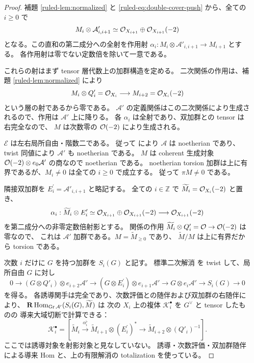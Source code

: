 \begin{proof}
補題 \ref{ruled-lem:normalized} と \eqref{ruled-eq:double-cover-push} から、全ての $i\ge0$ で
\[
 M_i\otimes\mathcal A'_{i,i+1}
 \simeq\mathcal O_{X_{i+1}}\oplus\mathcal O_{X_{i+1}}(-2)
\]
となる。この直和の第二成分への全射を作用射
$\alpha_i:M_i\otimes\mathcal A'_{i,i+1}\to M_{i+1}$ とする。
各作用射は零でない定数倍を除いて一意である。

これらの射はまず tensor 層代数上の加群構造を定める。
二次関係の作用は、補題 \ref{ruled-lem:normalized} により
\[
 M_i\otimes Q'_i=\mathcal O_{X_i}
 \longrightarrow M_{i+2}=\mathcal O_{X_i}(-2)
\]
という層の射であるから零である。
$\mathcal A'$ の定義関係はこの二次関係により生成されるので、作用は
$\mathcal A'$ 上に降りる。
各 $\alpha_i$ は全射であり、双加群との tensor は右完全なので、
$M$ は次数零の $\mathcal O(-2)$ により生成される。

$\mathcal E$ は左右局所自由・階数二である。
従って \cite[Theorem 1.2]{VanDenBergh2012P1} により $\mathcal A$ は noetherian であり、
twist 同値により $\mathcal A'$ も noetherian である。
$M$ は coherent 生成対象 $\mathcal O(-2)\otimes e_0\mathcal A'$ の商なので noetherian である。
noetherian torsion 加群は上に有界であるが、$M_i\ne0$ は全ての $i\ge0$ で成立する。
従って $\pi M\ne0$ である。

隣接双加群を $E_i^\prime=\mathcal A'_{i,i+1}$ と略記する。
全ての $i\in\mathbb Z$ で $\widetilde M_i=\mathcal O_{X_i}(-2)$ と置き、
\[
 \alpha_i:\widetilde M_i\otimes E_i^\prime
 \simeq\mathcal O_{X_{i+1}}\oplus\mathcal O_{X_{i+1}}(-2)
 \longrightarrow\mathcal O_{X_{i+1}}(-2)
\]
を第二成分への非零定数倍射影とする。
関係の作用 $\widetilde M_i\otimes Q'_i=\mathcal O\to\mathcal O(-2)$ は零なので、
これは $\mathcal A'$ 加群である。$M=\widetilde M_{\ge0}$ であり、
$\widetilde M/M$ は上に有界だから torsion である。

次数 $i$ だけに $G$ を持つ加群を $S_i(G)$ と記す。
標準二次解消 \cite[Theorem 7.1.2]{VanDenBergh2012P1} を twist して、局所自由 $G$ に対し
\[
 0\to(G\otimes Q'_i)\otimes e_{i+2}\mathcal A'
 \to(G\otimes E_i^\prime)\otimes e_{i+1}\mathcal A'
 \to G\otimes e_i\mathcal A'\to S_i(G)\to0
\]
を得る。
各誘導関手は完全であり、次数評価との随伴および双加群の右随伴により、
$\mathbf R\operatorname{Hom}_{\operatorname{Gr}\mathcal A'}(S_i(G),\widetilde M)$ は
次の $X_i$ 上の複体 $\mathcal K_i^\bullet$ を $G^\vee$ と tensor したものの
導来大域切断で計算できる：
\[
 \mathcal K_i^\bullet=
 \left[
 \widetilde M_i\xrightarrow{\alpha_i^\flat}
 \widetilde M_{i+1}\otimes(E_i^\prime)^*
 \longrightarrow\widetilde M_{i+2}\otimes(Q'_i)^{-1}
 \right].
\]
ここでは誘導対象を射影対象と見なしていない。
誘導・次数評価・双加群随伴による導来 Hom と、上の有限解消の totalization を使っている。


\end{proof}
